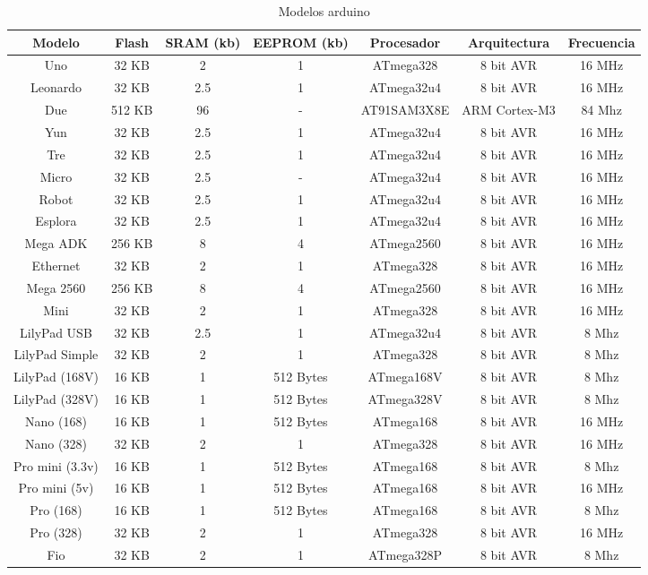 \begin{table}[htbp]
\centering
\scriptsize
\setlength\tabcolsep{2pt}
\caption{Modelos arduino}
\label{table-arduino}
\begin{tabular}{|c|c|c|c|c|c|c|}
  \hline
  Modelo & Flash & SRAM (kb) & EEPROM (kb) & Procesador & Arquitectura & Frecuencia \\
  \hline
  Uno & 32 KB & 2 & 1 & ATmega328 & 8 bit AVR & 16 MHz \\
  \hline
  Leonardo & 32 KB & 2.5 & 1 & ATmega32u4 & 8 bit AVR & 16 MHz \\
  \hline
  Due & 512 KB & 96 & - & AT91SAM3X8E & ARM Cortex-M3 & 84 Mhz \\
  \hline
  Yun & 32 KB & 2.5 & 1 & ATmega32u4 & 8 bit AVR & 16 MHz \\
  \hline
  Tre & 32 KB & 2.5 & 1 & ATmega32u4 & 8 bit AVR & 16 MHz \\
  \hline
  Micro & 32 KB & 2.5 & - & ATmega32u4 & 8 bit AVR & 16 MHz \\
  \hline
  Robot & 32 KB & 2.5 & 1 & ATmega32u4 & 8 bit AVR & 16 MHz \\
  \hline
  Esplora & 32 KB & 2.5 & 1 & ATmega32u4 & 8 bit AVR & 16 MHz \\
  \hline
  Mega ADK & 256 KB & 8 & 4 & ATmega2560 & 8 bit AVR & 16 MHz \\
  \hline
  Ethernet & 32 KB & 2 & 1 & ATmega328 & 8 bit AVR & 16 MHz \\
  \hline
Mega 2560 & 256 KB & 8 & 4 & ATmega2560 & 8 bit AVR & 16 MHz \\
  \hline
  Mini & 32 KB & 2 & 1 & ATmega328 & 8 bit AVR & 16 MHz \\
  \hline
  LilyPad USB & 32 KB & 2.5 & 1 & ATmega32u4 & 8 bit AVR & 8 Mhz \\
  \hline
  LilyPad Simple & 32 KB & 2 & 1 & ATmega328 & 8 bit AVR & 8 Mhz \\
  \hline
  LilyPad (168V) & 16 KB & 1 & 512 Bytes & ATmega168V & 8 bit AVR & 8 Mhz \\
  \hline
  LilyPad (328V) & 16 KB & 1 & 512 Bytes & ATmega328V & 8 bit AVR & 8 Mhz \\
  \hline
  Nano (168) & 16 KB & 1 & 512 Bytes & ATmega168 & 8 bit AVR & 16 MHz \\
  \hline
  Nano (328) & 32 KB & 2 & 1 & ATmega328 & 8 bit AVR & 16 MHz \\
  \hline
  Pro mini (3.3v) & 16 KB & 1 & 512 Bytes & ATmega168 & 8 bit AVR & 8 Mhz \\
  \hline
  Pro mini (5v) & 16 KB & 1 & 512 Bytes & ATmega168 & 8 bit AVR & 16 MHz \\
  \hline
  Pro (168) & 16 KB & 1 & 512 Bytes & ATmega168 & 8 bit AVR & 8 Mhz \\
  \hline
  Pro (328) & 32 KB & 2 & 1 & ATmega328 & 8 bit AVR & 16 MHz \\
  \hline
  Fio & 32 KB & 2 & 1 & ATmega328P & 8 bit AVR & 8 Mhz \\
  \hline 
\end{tabular}
\end{table}

